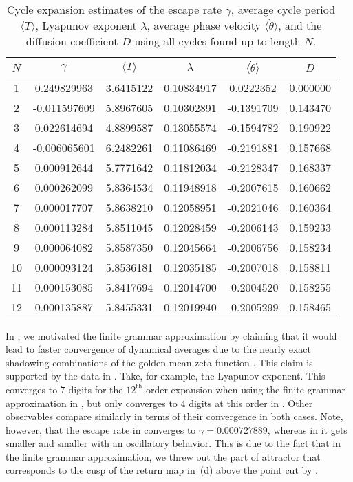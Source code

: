 \begin{table}
    \caption{Cycle expansion estimates of the escape rate $\gamma$, average
    cycle period $\langle T \rangle$, Lyapunov exponent $\lambda$, average
    phase velocity $\langle \dot{\theta} \rangle$, and the diffusion coefficient
    $D$ using all cycles found up to length $N$.}
    \label{t-DynamicalAveragesNoGrammar}
    \begin{tabular}{c|c|c|c|c|c}
     $N$ & $\gamma$ & $\langle T \rangle$ & $\lambda$ & $\langle \dot{\theta} \rangle$ & $D$ \\
    \hline
    1 & 0.249829963 & 3.6415122 & 0.10834917 & 0.0222352 &  0.000000 \\
    2 & -0.011597609 & 5.8967605 & 0.10302891 & -0.1391709 &  0.143470 \\
    3 & 0.022614694 & 4.8899587 & 0.13055574 & -0.1594782 &  0.190922 \\
    4 & -0.006065601 & 6.2482261 & 0.11086469 & -0.2191881 &  0.157668 \\
    5 & 0.000912644 & 5.7771642 & 0.11812034 & -0.2128347 &  0.168337 \\
    6 & 0.000262099 & 5.8364534 & 0.11948918 & -0.2007615 &  0.160662 \\
    7 & 0.000017707 & 5.8638210 & 0.12058951 & -0.2021046 &  0.160364 \\
    8 & 0.000113284 & 5.8511045 & 0.12028459 & -0.2006143 &  0.159233 \\
    9 & 0.000064082 & 5.8587350 & 0.12045664 & -0.2006756 &  0.158234 \\
    10 & 0.000093124 & 5.8536181 & 0.12035185 & -0.2007018 &  0.158811 \\
    11 & 0.000153085 & 5.8417694 & 0.12014700 & -0.2004520 &  0.158255 \\
    12 & 0.000135887 & 5.8455331 & 0.12019940 & -0.2005299 &  0.158465 \\
    \end{tabular}
\end{table}
In , we motivated the finite grammar approximation by
claiming that it would lead to faster convergence of dynamical averages 
due to the nearly exact shadowing combinations of the golden mean zeta function
. This claim is supported by the data
in . Take, for example, the
Lyapunov exponent. This converges to $7$ digits for the $12^{\mathrm{th}}$ order
expansion when using the finite grammar approximation in
, but only converges to $4$ digits at this order in
. Other observables compare similarly in
terms of their convergence in both cases. Note, however, that the escape rate
in  converges to $\gamma = 0.000727889$, whereas
in  it gets smaller and smaller with an
oscillatory behavior. This is due to the fact that in the finite grammar
approximation, we threw out the part of attractor that corresponds to the
cusp of the return map in \,(d) above the point cut 
by .

